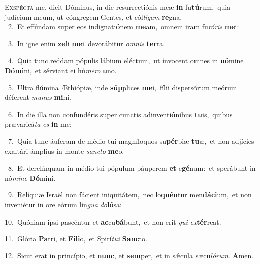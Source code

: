 \lettrine{\initial\textcolor{\initialcolor}{E}}{xspécta} me, dicit Dóminus, in die resurrectiónis meæ \textbf{in} fu\-\textbf{tú}\-rum,~\star quia judícium meum, ut cóngregem Gentes, et cól\-\textit{li}\-\textit{gam} \textbf{re}\-gna,\\
{\numbfont\textcolor{\numbcolor}{~2.}}~Et effúndam super eos indignati\-\textbf{ó}\-nem \textbf{me}\-am,~\star omnem iram fu\-\textit{ró}\-\textit{ris} \textbf{me}\-i:\par
{\numbfont\textcolor{\numbcolor}{~3.}}~In igne enim \textbf{ze}\-li \textbf{me}\-i~\star devorábitur \textit{om}\-\textit{nis} \textbf{ter}\-ra.\par
{\numbfont\textcolor{\numbcolor}{~4.}}~Quia tunc reddam pópulis lábium eléctum,~\dagger ut ínvocent omnes in \textbf{nó}\-mine \textbf{Dó}\-\textbf{mi}ni,~\star et sérviant ei hú\-\textit{me}\-\textit{ro} \textbf{u}\-no.\par
{\numbfont\textcolor{\numbcolor}{~5.}}~Ultra flúmina Æthiópiæ, inde \textbf{súp}\-plices \textbf{me}\-i,~\star fílii dispersórum meórum déferent \textit{mu}\-\textit{nus} \textbf{mi}\-hi.\par
{\numbfont\textcolor{\numbcolor}{~6.}}~In die illa non confundéris super cunctis adinventi\-\textbf{ó}\-nibus \textbf{tu}\-is,~\star quibus prævaricá\textit{ta} \textit{es} \textbf{in} me:\par
{\numbfont\textcolor{\numbcolor}{~7.}}~Quia tunc áuferam de médio tui magníloquos su\-\textbf{pér}\-biæ \textbf{tu}\-æ,~\star et non adjícies exaltári ámplius in monte \textit{sanc}\-\textit{to} \textbf{me}\-o.\par
{\numbfont\textcolor{\numbcolor}{~8.}}~Et derelínquam in médio tui pópulum páuperem \textbf{et} e\-\textbf{gé}\-num:~\star et sperábunt in nó\-\textit{mi}\-\textit{ne} \textbf{Dó}\-mini.\par
{\numbfont\textcolor{\numbcolor}{~9.}}~Relíquiæ Israël non fácient iniquitátem,~\dagger nec lo\-\textbf{quén}\-tur men\-\textbf{dá}\-\textbf{ci}um,~\star et non inveniétur in ore eórum lin\textit{gua} \textit{do}\-\textbf{ló}sa:\par
{\numbfont\textcolor{\numbcolor}{10.}}~Quóniam ipsi pascéntur et \textbf{ac}\-cu\-\textbf{bá}\-bunt,~\star et non erit \textit{qui} \textit{ex}\-\textbf{tér}reat.\par
{\numbfont\textcolor{\numbcolor}{11.}}~Glória \textbf{Pa}\-tri, et \textbf{Fí}\-\textbf{li}o,~\star et Spirí\-\textit{tu}\-\textit{i} \textbf{Sanc}\-to.\par
{\numbfont\textcolor{\numbcolor}{12.}}~Sicut erat in princípio, et \textbf{nunc}\-, et \textbf{sem}\-per,~\star et in sǽcula sæcu\-\textit{ló}\-\textit{rum}. \textbf{A}\-men.\par
